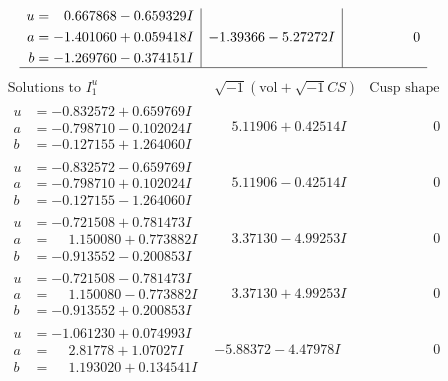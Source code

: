 \documentclass[1p]{elsarticle_modified}
\theoremstyle{definition}
\newcommand{\I}{\sqrt{-1}}
\begin{document}
$$\begin{array}{c|c|c}
\begin{aligned}
u &= \phantom{-}0.667868 - 0.659329 I \\
a &= -1.401060 + 0.059418 I \\
b &= -1.269760 - 0.374151 I\end{aligned}
 & -1.39366 - 5.27272 I & \phantom{-0.000000 } 0\\
 \hline 
 \end{array}$$\newpage$$\begin{array}{c|c|c}  
\text{Solutions to }I^u_{1}& \I (\text{vol} + \sqrt{-1}CS) & \text{Cusp shape}\\
 \hline 
\begin{aligned}
u &= -0.832572 + 0.659769 I \\
a &= -0.798710 - 0.102024 I \\
b &= -0.127155 + 1.264060 I\end{aligned}
 & \phantom{-}5.11906 + 0.42514 I & \phantom{-0.000000 } 0 \\ \hline\begin{aligned}
u &= -0.832572 - 0.659769 I \\
a &= -0.798710 + 0.102024 I \\
b &= -0.127155 - 1.264060 I\end{aligned}
 & \phantom{-}5.11906 - 0.42514 I & \phantom{-0.000000 } 0 \\ \hline\begin{aligned}
u &= -0.721508 + 0.781473 I \\
a &= \phantom{-}1.150080 + 0.773882 I \\
b &= -0.913552 - 0.200853 I\end{aligned}
 & \phantom{-}3.37130 - 4.99253 I & \phantom{-0.000000 } 0 \\ \hline\begin{aligned}
u &= -0.721508 - 0.781473 I \\
a &= \phantom{-}1.150080 - 0.773882 I \\
b &= -0.913552 + 0.200853 I\end{aligned}
 & \phantom{-}3.37130 + 4.99253 I & \phantom{-0.000000 } 0 \\ \hline\begin{aligned}
u &= -1.061230 + 0.074993 I \\
a &= \phantom{-}2.81778 + 1.07027 I \\
b &= \phantom{-}1.193020 + 0.134541 I\end{aligned}
 & -5.88372 - 4.47978 I & \phantom{-0.000000 } 0 \\ \hline\begin{aligned}

\end{aligned}
\end{array}$$
\end{document}
